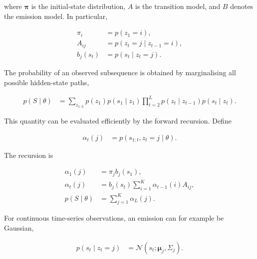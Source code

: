 \documentclass{book}
\begin{document}
        \noindent
        where \(\boldsymbol{\ensuremath{\pi}}\) is the initial-state distribution, \(A\) is the transition model, and \(B\) denotes the emission model. In particular,

        \begin{align}
            \ensuremath{\pi}_i
            &=
            p(z_1=i),\\
            A_{ij}
            &=
            p(z_t=j\mid z_{t-1}=i),\\
            b_j(s_t)
            &=
            p(s_t\mid z_t=j).
        \end{align}

        \noindent
        The probability of an observed subsequence is obtained by marginalising all possible hidden-state paths,

        \begin{align}
            p(S\mid\ensuremath{\theta})
            &=
            \sum_{z_{1:L}}
            p(z_1)
            p(s_1\mid z_1)
            \prod_{t=2}^{L}
            p(z_t\mid z_{t-1})
            p(s_t\mid z_t).
        \end{align}

        \noindent
        This quantity can be evaluated efficiently by the forward recursion. Define

        \begin{align}
            \ensuremath{\alpha}_t(j)
            &=
            p(s_{1:t},z_t=j\mid\ensuremath{\theta}).
        \end{align}

        \noindent
        The recursion is

        \begin{align}
            \ensuremath{\alpha}_1(j)
            &=
            \ensuremath{\pi}_j b_j(s_1),\\
            \ensuremath{\alpha}_t(j)
            &=
            b_j(s_t)
            \sum_{i=1}^{K}
            \ensuremath{\alpha}_{t-1}(i)A_{ij},\\
            p(S\mid\ensuremath{\theta})
            &=
            \sum_{j=1}^{K}\ensuremath{\alpha}_L(j).
        \end{align}

        \noindent
        For continuous time-series observations, an emission can for example be Gaussian,

        \begin{align}
            p(s_t\mid z_t=j)
            &=
            \mathcal{N}
            \left(
            s_t;\boldsymbol{\ensuremath{\mu}}_j,\ensuremath{\Sigma}_j
            \right).
        \end{align}
\end{document}
